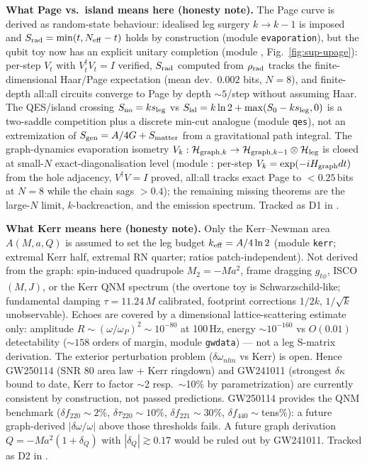 \documentclass[11pt]{article}
\begin{document}
\textbf{What Page vs.\ island means here (honesty note).} The Page curve is derived as
random-state behaviour: idealised leg surgery $k\to k-1$ is imposed and $S_{\rm rad}=\min(t,N_{\rm eff}-t)$
holds by construction (module \texttt{evaporation}), but the qubit toy now has an explicit unitary
completion (module , Fig.~\ref{fig:sup-upage}): per-step $V_t$ with
$V_t^\dagger V_t=I$ verified, $S_{\rm rad}$ computed from $\rho_{\rm rad}$ tracks the finite-dimensional
Haar/Page expectation (mean dev.\ $0.002$ bits, $N=8$), and finite-depth all:all circuits converge to
Page by depth $\sim5$/step without assuming Haar. The QES/island crossing
$S_{\rm no}=ks_{\rm leg}$ vs $S_{\rm isl}=k\ln2+\max(S_0-ks_{\rm leg},0)$ is a two-saddle
competition plus a discrete min-cut analogue (module \texttt{qes}), not an extremization of
$S_{\rm gen}=A/4G+S_{\rm matter}$ from a gravitational path integral. The graph-dynamics
evaporation isometry $V_k:{\cal H}_{{\rm graph},k}\to{\cal H}_{{\rm graph},k-1}\otimes{\cal H}_{\rm leg}$
is closed at small-$N$ exact-diagonalisation level (module : per-step
$V_k = \exp(-iH_{\rm graph}dt)$ from the hole adjacency, $V^\dagger V = I$ proved,
all:all tracks exact Page to $< 0.25$\,bits at $N = 8$ while the chain sags $> 0.4$);
the remaining missing theorems are the large-$N$ limit, $k$-backreaction, and the emission
spectrum. Tracked as D1 in .

\textbf{What Kerr means here (honesty note).} Only the Kerr--Newman area $A(M,a,Q)$ is assumed to
set the leg budget $k_{\rm eff}=A/4\ln2$ (module \texttt{kerr}; extremal Kerr half, extremal RN
quarter; ratios patch-independent). Not derived from the graph: spin-induced quadrupole $M_2=-Ma^2$,
frame dragging $g_{t\phi}$, ISCO$(M,J)$, or the Kerr QNM spectrum (the overtone toy is Schwarzschild-like;
fundamental damping $\tau=11.24\,M$ calibrated, footprint corrections $1/2k$, $1/\sqrt{k}$ unobservable).
Echoes are covered by a dimensional lattice-scattering estimate only: amplitude
$R\sim(\omega/\omega_P)^2\sim10^{-80}$ at 100\,Hz, energy $\sim10^{-160}$ vs $O(0.01)$
detectability ($\sim158$ orders of margin, module \texttt{gwdata}) --- not a leg S-matrix derivation.
The exterior perturbation problem ($\delta\omega_{nlm}$ vs Kerr) is open.
Hence GW250114 (SNR 80 area law + Kerr ringdown) and GW241011 (strongest $\delta\kappa$ bound to date,
Kerr to factor $\sim$2 resp.\ $\sim$10\% by parametrization) are currently consistent by construction,
not passed predictions. GW250114 provides the QNM benchmark ($\delta f_{220}\sim2\%$,
$\delta\tau_{220}\sim10\%$, $\delta f_{221}\sim30\%$, $\delta f_{440}\sim$tens\%):
a future graph-derived $|\delta\omega/\omega|$ above those thresholds fails.
A future graph derivation $Q=-Ma^2(1+\delta_Q)$ with $|\delta_Q|\gtrsim0.17$
would be ruled out by GW241011. Tracked as D2 in .
\end{document}
